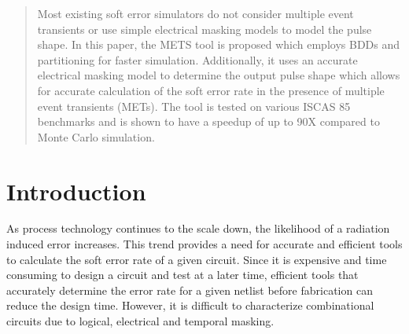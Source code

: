 \documentclass[conference]{IEEEtran}
\begin{document}
% 


\maketitle


\begin{abstract}

Most existing soft error simulators do not consider multiple event transients or use simple electrical masking models to model the pulse shape. In this paper, the METS tool is proposed which employs BDDs and partitioning for faster simulation. Additionally, it uses an accurate electrical masking model to determine the output pulse shape which allows for accurate calculation of the soft error rate in the presence of multiple event transients (METs). The tool is tested on various ISCAS 85 benchmarks and is shown to have a speedup of up to 90X compared to Monte Carlo simulation.

\end{abstract}


\section{Introduction} 

As process technology continues to the scale down, the likelihood of a radiation induced error increases. This trend provides a need for accurate and efficient tools to calculate the soft error rate of a given circuit. Since it is expensive and time consuming to design a circuit and test at a later time, efficient tools that accurately determine the error rate for a given netlist before fabrication can reduce the design time. However, it is difficult to characterize combinational circuits due to logical, electrical and temporal masking.
\end{document}
